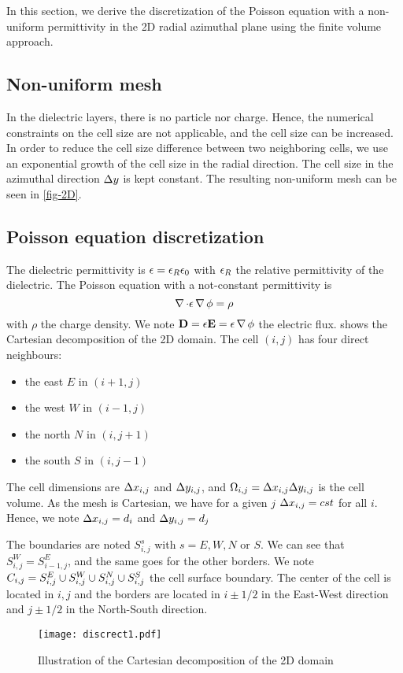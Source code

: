   In this section, we derive the discretization of the Poisson equation with a non-uniform permittivity in the \ac{2D} radial azimuthal plane using the finite volume approach.


  \subsection{Non-uniform mesh}

    In the dielectric layers, there is no particle nor charge.
    Hence, the numerical constraints on the cell size are not applicable, and the cell size can be increased.
    In order to reduce the cell size difference between two neighboring cells, we use an exponential growth of the cell size in the radial direction.
    The cell size in the azimuthal direction $\Delta y$ is kept constant.
    The resulting non-uniform mesh can be seen in \cref{fig-2D}.


  \subsection{Poisson equation discretization}


  The dielectric permittivity is $\epsilon= \epsilon_{R} \epsilon_0$ with $\epsilon_{R}$ the relative permittivity of the dielectric.
  The Poisson equation with a not-constant permittivity is
  \begin{equation} \label{eq-poissondiel}
    \operatorname{{\mathbf \nabla}} \cdot \epsilon \operatorname{{\mathbf \nabla}} \phi = \rho
  \end{equation}
  with $\rho$ the charge density.
  We note ${\mathbf D}=\epsilon {\mathbf E} = \epsilon \operatorname{{\mathbf \nabla}} \phi$ the electric flux.
   shows the Cartesian decomposition of the \ac{2D} domain.
  The cell $(i,j)$ has four direct neighbours\string:
  \begin{itemize}
    \item the east $E$ in $(i+1,j)$
    \item the west $W$ in $(i-1, j)$
    \item the north $N$ in $(i, j+1)$
    \item the south $S$ in $(i, j-1)$
  \end{itemize}
  The cell dimensions are $\Delta x_{i,j}$ and $\Delta y_{i,j}$, and $\Omega_{i,j}=\Delta x_{i,j} \Delta y_{i,j}$ is the cell volume.
  As the mesh is Cartesian, we have for a given $j$ $\Delta x_{i,j} = cst$ for all $i$. Hence, we note $\Delta x_{i,j} = d_i$ and $\Delta y_{i,j} = d_j$

  The boundaries are noted $S^s_{i,j}$ with $s=E,W,N$ or $S$.
  We can see that $S^W_{i,j}=S^E_{i-1,j}$, and the same goes for the other borders.
  We note $C_{i,j} = S^E_{i,j} \cup S^W_{i,j} \cup S^N_{i,j} \cup S^S_{i,j}$ the cell surface boundary.
  The center of the cell is located in $i,j$ and the borders are located in $i\pm 1/2$ in the East-West direction and $j\pm 1/2$ in the North-South direction.
  \begin{figure}[hbt]
    \centering
    \texttt{[image: discrect1.pdf]}
    \caption{Illustration of the Cartesian decomposition of the \ac{2D} domain}
    \label{fig-decompo1}
  \end{figure}


